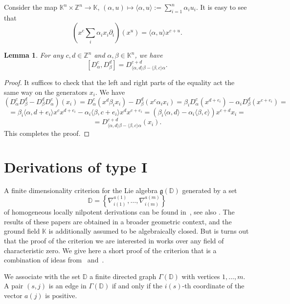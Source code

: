 \documentclass[a4paper, 12pt,oneside,reqno]{amsart}
\numberwithin{equation}{section}
\newtheorem{lemma}[theorem]{Lemma}
\theoremstyle{definition}
\begin{document}
Consider the map $\mathbb{K}^n\times\mathbb{Z}^n\to\mathbb{K}$, $(\alpha,u)\mapsto\langle\alpha,u\rangle:=\sum_{i=1}^n \alpha_i u_i$. It is easy to see that
$$
(x^c\sum_i\alpha_ix_i\partial_i)(x^u)=\langle\alpha,u\rangle x^{c+u}.
$$

\begin{lemma} \label{luse}
For any $c,d\in\mathbb{Z}^n$ and $\alpha,\beta\in\mathbb{K}^n$, we have
$$
[D^c_{\alpha},D^d_{\beta}]=D^{c+d}_{\langle\alpha,d\rangle\beta-\langle\beta,c\rangle\alpha}.
$$
\end{lemma} 

\begin{proof}
It suffices to check that the left and right parts of the equality act the same way on the generators $x_i$. We have
$$
(D^c_{\alpha}D^d_{\beta}-D^d_{\beta}D^c_{\alpha})(x_i)=D^c_{\alpha}(x^d\beta_i x_i)-D^d_{\beta}(x^c\alpha_i x_i)=\beta_i D^c_{\alpha}(x^{d+e_i})-\alpha_i D^d_{\beta}(x^{c+e_i})=
$$
$$
=\beta_i\langle\alpha,d+e_i\rangle x^cx^{d+e_i}-\alpha_i\langle\beta,c+e_i\rangle x^dx^{c+e_i}=(\beta_i\langle\alpha,d\rangle-\alpha_i\langle\beta,c\rangle)x^{c+d}x_i=
$$
$$
=D^{c+d}_{\langle\alpha,d\rangle\beta-\langle\beta,c\rangle\alpha}(x_i).
$$
This completes the proof.
\end{proof}

\section{Derivations of type I}
\label{s2}

A finite dimensionality criterion for the Lie algebra $\mathfrak{g}(\mathbb{D})$ generated by a set 
$$
\mathbb{D}=\left\{\nabla^{a(1)}_{i(1)},\ldots,\nabla^{a(m)}_{i(m)}\right\}
$$ 
of homogeneous locally nilpotent derivations can be found in~\cite[Theorem~5.1]{ALS}, see also \cite[Proposition~4.8]{AZ}. The results of these papers are obtained in a broader geometric context, and the ground field $\mathbb{K}$ is additionally assumed to be algebraically closed. But is turns out that the proof of the criterion we are interested in works over any field of characteristic zero. We give here a short proof of the criterion that is a combination of ideas from~\cite{ALS} and~\cite{AZ}. 

We associate with the set $\mathbb{D}$ a finite directed graph $\Gamma(\mathbb{D})$ with vertices $1,\ldots, m$. A pair $(s,j)$ is an edge in $\Gamma(\mathbb{D})$ if and only if the $i(s)$-th coordinate of the vector $a(j)$ is positive.
\end{document}
